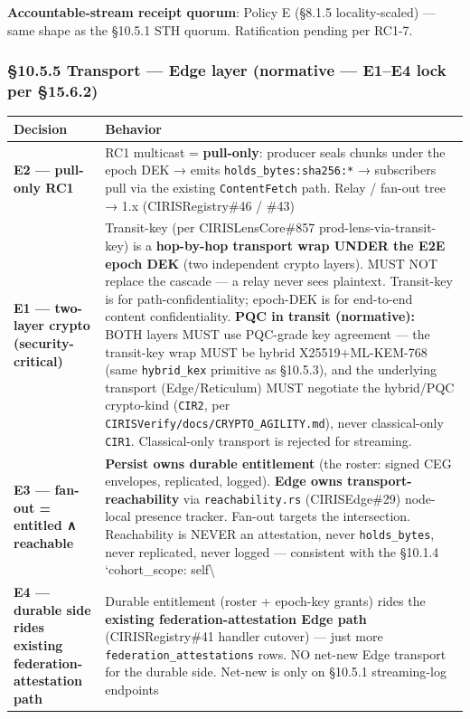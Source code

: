 \documentclass[11pt]{article}
\begin{document}
\textbf{Accountable-stream receipt quorum}: Policy E (§8.1.5 locality-scaled) — same shape as the §10.5.1 STH quorum. Ratification pending per RC1-7.


\subsubsection*{§10.5.5 Transport — Edge layer (normative — E1–E4 lock per §15.6.2)}


{\footnotesize
\begin{longtable}{|p{8.0cm}|p{8.0cm}|}\hline
\textbf{Decision} & \textbf{Behavior} \\ \hline\endhead
\textbf{E2 — pull-only RC1} & RC1 multicast = \textbf{pull-only}: producer seals chunks under the epoch DEK → emits \texttt{holds\_bytes:sha256:*} → subscribers pull via the existing \texttt{ContentFetch} path. Relay / fan-out tree → 1.x (CIRISRegistry\#46 / \#43) \\ \hline
\textbf{E1 — two-layer crypto (security-critical)} & Transit-key (per CIRISLensCore\#857 prod-lens-via-transit-key) is a \textbf{hop-by-hop transport wrap UNDER the E2E epoch DEK} (two independent crypto layers). MUST NOT replace the cascade — a relay never sees plaintext. Transit-key is for path-confidentiality; epoch-DEK is for end-to-end content confidentiality. \textbf{PQC in transit (normative):} BOTH layers MUST use PQC-grade key agreement — the transit-key wrap MUST be hybrid X25519+ML-KEM-768 (same \texttt{hybrid\_kex} primitive as §10.5.3), and the underlying transport (Edge/Reticulum) MUST negotiate the hybrid/PQC crypto-kind (\texttt{CIR2}, per \texttt{CIRISVerify/docs/CRYPTO\_AGILITY.md}), never classical-only \texttt{CIR1}. Classical-only transport is rejected for streaming. \\ \hline
\textbf{E3 — fan-out = entitled ∧ reachable} & \textbf{Persist owns durable entitlement} (the roster: signed CEG envelopes, replicated, logged). \textbf{Edge owns transport-reachability} via \texttt{reachability.rs} (CIRISEdge\#29) node-local presence tracker. Fan-out targets the intersection. Reachability is NEVER an attestation, never \texttt{holds\_bytes}, never replicated, never logged — consistent with the §10.1.4 `cohort\_scope: self\textbackslash{} \\ \hline
\textbf{E4 — durable side rides existing federation-attestation path} & Durable entitlement (roster + epoch-key grants) rides the \textbf{existing federation-attestation Edge path} (CIRISRegistry\#41 handler cutover) — just more \texttt{federation\_attestations} rows. NO net-new Edge transport for the durable side. Net-new is only on §10.5.1 streaming-log endpoints \\ \hline
\end{longtable}}
\end{document}
